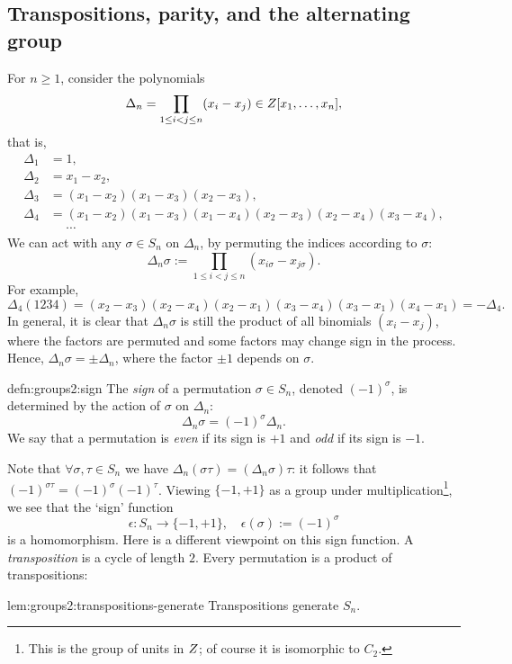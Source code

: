 \subsection{Transpositions, parity, and the alternating group}
\label{subsec:groups2:transpositions-parity-and-the-alternating-group}
For $n \geq 1$, consider the polynomials
\[
  \Delta_n = \prod_{1 \leq i < j \leq n} (x_i - x_j) \in Z[x_1,
  \dots, x_n],
\]
that is,
\begin{align*}
  \Delta_1 &= 1,\\
  \Delta_2 &= x_1 - x_2,\\
  \Delta_3 &= (x_1 - x_2)(x_1 - x_3)(x_2 - x_3),\\
  \Delta_4 &= (x_1 - x_2)(x_1 - x_3)(x_1 - x_4)(x_2 - x_3)
             (x_2 - x_4)(x_3 - x_4),\\
           &\phantom{{}={}}\cdots
\end{align*}
We can act with any $\sigma \in S_n$ on $\Delta_n$, by permuting the
indices according to $\sigma$:
\[
  \Delta_n\sigma := \prod_{1 \leq i < j \leq n} (x_{i\sigma} -
  x_{j\sigma}).
\]
For example,
\[
  \Delta_4(1234) = (x_2 - x_3)(x_2 - x_4)(x_2 - x_1)(x_3 - x_4) (x_3 -
  x_1)(x_4 - x_1) = -\Delta_4.
\]
In general, it is clear that $\Delta_n\sigma$ is still the product of
all binomials $(x_i - x_j)$, where the factors are permuted and some
factors may change sign in the process. Hence,
$\Delta_n\sigma = \pm\Delta_n$, where the factor $\pm 1$ depends on
$\sigma$.
\begin{defn}{}{defn:groups2:sign}
  The \emph{sign} of a permutation $\sigma \in S_n$, denoted
  $(-1)^\sigma$, is determined by the action of $\sigma$ on
  $\Delta_n$:
  \[
    \Delta_n\sigma = (-1)^\sigma \Delta_n.
  \]
  We say that a permutation is \emph{even} if its sign is $+1$ and
  \emph{odd} if its sign is $-1$.
\end{defn}

Note that $\forall\sigma,\tau \in S_n$ we have
$\Delta_n(\sigma\tau) = (\Delta_n\sigma)\tau$: it follows that
$(-1)^{\sigma\tau} = (-1)^\sigma (-1)^\tau$. Viewing $\{-1,+1\}$ as a
group under multiplication\footnote{This is the group of units in
  $Z$; of course it is isomorphic to $C_2$.}, we see that the `sign'
function
\[
  \epsilon : S_n \to \{-1,+1\}, \quad \epsilon(\sigma) := (-1)^\sigma
\]
is a homomorphism.  Here is a different viewpoint on this sign
function. A \emph{transposition} is a cycle of length $2$. Every
permutation is a product of transpositions:

\begin{lem}{}{lem:groups2:transpositions-generate}
  Transpositions generate $S_n$.
\end{lem}

